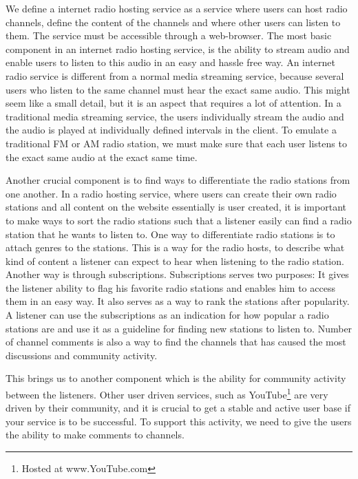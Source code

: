 \documentclass[a4paper,11pt,report]{article}
\begin{document}
We define a internet radio hosting service as a service where users can host radio channels, define the content of the channels and where other users can listen to them. The service must be accessible through a web-browser. The most basic component in an internet radio hosting service, is the ability to stream audio and enable users to listen to this audio in an easy and hassle free way. An internet radio service is different from a normal media streaming service, because several users who listen to the same channel must hear the exact same audio. This might seem like a small detail, but it is an aspect that requires a lot of attention. In a traditional media streaming service, the users individually stream the audio and the audio is played at individually defined intervals in the client. To emulate a traditional FM or AM radio station, we must make sure that each user listens to the exact same audio at the exact same time. 

Another crucial component is to find ways to differentiate the radio stations from one another. In a radio hosting service, where users can create their own radio stations and all content on the website essentially is user created, it is important to make ways to sort the radio stations such that a listener easily can find a radio station that he wants to listen to. One way to differentiate radio stations is to attach genres to the stations. This is a way for the radio hosts, to describe what kind of content a listener can expect to hear when listening to the radio station. Another way is through subscriptions. Subscriptions serves two purposes: It gives the listener ability to flag his favorite radio stations and enables him to access them in an easy way. It also serves as a way to rank the stations after popularity. A listener can use the subscriptions as an indication for how popular a radio stations are and use it as a guideline for finding new stations to listen to. Number of channel comments is also a way to find the channels that has caused the most discussions and community activity. 

This brings us to another component which is the ability for community activity between the listeners. Other user driven services, such as YouTube\footnote{Hosted at www.YouTube.com} are very driven by their community, and it is crucial to get a stable and active user base if your service is to be successful. To support this activity, we need to give the users the ability to make comments to channels.
\end{document}
